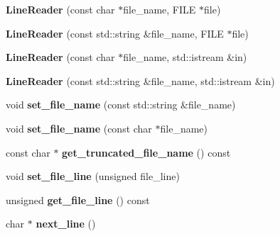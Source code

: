 \begin{DoxyCompactItemize}
\item 
\mbox{\label{classio_1_1LineReader_ad2a8943ba0848ae5052e2f5ad30c010e}} 
{\bfseries Line\+Reader} (const char $\ast$file\+\_\+name, F\+I\+LE $\ast$file)
\item 
\mbox{\label{classio_1_1LineReader_a93fa2e3ae98b0e7a7391714d6395c552}} 
{\bfseries Line\+Reader} (const std\+::string \&file\+\_\+name, F\+I\+LE $\ast$file)
\item 
\mbox{\label{classio_1_1LineReader_a301c08eb9ca5d3fdccf4e9a8e5ac82f8}} 
{\bfseries Line\+Reader} (const char $\ast$file\+\_\+name, std\+::istream \&in)
\item 
\mbox{\label{classio_1_1LineReader_a3eacf4d1539a24122c6897fce4e72f06}} 
{\bfseries Line\+Reader} (const std\+::string \&file\+\_\+name, std\+::istream \&in)
\item 
\mbox{\label{classio_1_1LineReader_a1a0763d491dec16cebc33134e965dfee}} 
void {\bfseries set\+\_\+file\+\_\+name} (const std\+::string \&file\+\_\+name)
\item 
\mbox{\label{classio_1_1LineReader_a81c56ac68497da5ec874333ce063fd83}} 
void {\bfseries set\+\_\+file\+\_\+name} (const char $\ast$file\+\_\+name)
\item 
\mbox{\label{classio_1_1LineReader_ad5817da6af1ae77daddec7aeaeebf2f8}} 
const char $\ast$ {\bfseries get\+\_\+truncated\+\_\+file\+\_\+name} () const
\item 
\mbox{\label{classio_1_1LineReader_a581b55d4ced6adb964de50fa8ac6eb08}} 
void {\bfseries set\+\_\+file\+\_\+line} (unsigned file\+\_\+line)
\item 
\mbox{\label{classio_1_1LineReader_a3f3459e22ed8e459238c290050b6722e}} 
unsigned {\bfseries get\+\_\+file\+\_\+line} () const
\item 
\mbox{\label{classio_1_1LineReader_a97f4e0129611d9da2b8c966ffe670be5}} 
char $\ast$ {\bfseries next\+\_\+line} ()
\end{DoxyCompactItemize}
